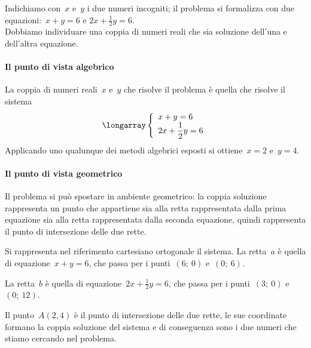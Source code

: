  \begin{soluzione}
Indichiamo con~$x$ e~$y$ i due numeri incogniti; il problema si formalizza
con due equazioni:~$x+y=6$ \quad e \quad $2x+\frac{1}{2}y=6$.\\
Dobbiamo individuare una coppia di numeri reali che sia soluzione
dell'una e dell'altra equazione.

\paragraph{Il punto di vista algebrico}
La coppia di numeri reali~$x$ e~$y$ che risolve il problema è quella che
risolve il sistema
\[\longarray\left\{\begin{array}{l}x+y=6\\2x+\dfrac{1}{2}y=6 
\end{array}\right.\]
Applicando uno qualunque dei metodi algebrici esposti si ottiene~$x=2$ e~$y=4$.

\paragraph{Il punto di vista geometrico}

Il problema si può spostare in ambiente geometrico: la coppia
soluzione rappresenta un punto che appartiene sia alla retta
rappresentata dalla prima equazione sia alla retta rappresentata dalla
seconda equazione, quindi rappresenta il punto di intersezione delle due rette.

Si rappresenta nel riferimento cartesiano ortogonale il sistema.
La retta~$a$ è quella di equazione~$x+y=6$, che passa per i
punti~$(6;~0)$ e~$(0;~6)$.

La retta~$b$ è quella di equazione~$2x+\frac{1}{2}y=6$, che
passa per i punti~$(3;~0)$ e~$(0;~12)$.

Il punto~$A(2,4)$ è il punto di intersezione delle due rette, le sue
coordinate formano la coppia soluzione del sistema e di conseguenza
sono i due numeri che stiamo cercando nel problema.

\begin{center}
\begin{inaccessibleblock}
 
\end{inaccessibleblock}
\end{center}
 \end{soluzione}

